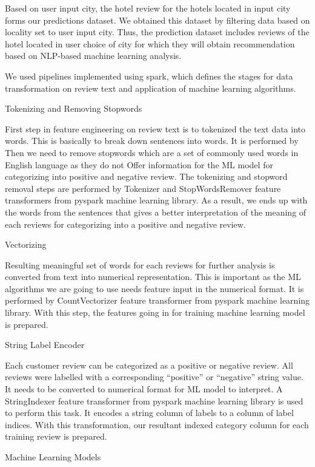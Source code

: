 \documentclass[conference]{IEEEtran}
\begin{document}
	Based on user input city, the hotel review for the hotels located in input city forms our predictions dataset. We obtained this dataset by filtering data based on locality set to user input city. Thus, the prediction dataset includes reviews of the hotel located in user choice of city for which they will obtain recommendation based on NLP-based machine learning analysis.
	
	We used pipelines implemented using spark, which defines the stages for data transformation on review text and application of machine learning algorithms.
	
	Tokenizing and Removing Stopwords
	
	First step in feature engineering on review text is to tokenized the text data into words. This is basically to break down sentences into words. It is performed by  Then we need to remove stopwords which are a set of commonly used words in English language as they do not Offer information for the ML model for categorizing into positive and negative review. The tokenizing and stopword removal steps are performed by Tokenizer and StopWordsRemover feature transformers from pyspark machine learning library. As a result, we ends up with the words from the sentences that gives a better interpretation of the meaning of each reviews for categorizing into a positive and negative review.
	
	Vectorizing
	
	Resulting meaningful set of words for each reviews for further analysis is converted from text into numerical representation. This is important as the ML algorithms we are going to use needs feature input in the numerical format. It is performed by CountVectorizer feature transformer from pyspark machine learning library. With this step, the features going in for training machine learning model is prepared.
	
	String Label Encoder
	
	Each customer review can be categorized as a positive or negative review. All reviews were labelled with a corresponding “positive” or “negative” string value. It needs to be converted to numerical format for ML model to interpret. A StringIndexer feature transformer from pyspark machine learning library is used to perform this task. It encodes a string column of labels to a column of label indices. With this transformation, our resultant indexed category column for each training review is prepared.
	
	Machine Learning Models
	
\end{document}
